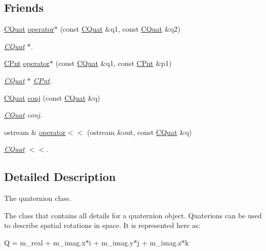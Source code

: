 \subsection*{Friends}
\begin{DoxyCompactItemize}
\item 
\hyperlink{classCQuat}{C\-Quat} \hyperlink{classCQuat_a56293e53132060601a281240804d9302}{operator$\ast$} (const \hyperlink{classCQuat}{C\-Quat} \&q1, const \hyperlink{classCQuat}{C\-Quat} \&q2)
\begin{DoxyCompactList}\small\item\em \hyperlink{classCQuat}{C\-Quat} $\ast$. \end{DoxyCompactList}\item 
\hyperlink{classCPnt}{C\-Pnt} \hyperlink{classCQuat_ac98154ed89178004c9023423651b58a9}{operator$\ast$} (const \hyperlink{classCQuat}{C\-Quat} \&q1, const \hyperlink{classCPnt}{C\-Pnt} \&p1)
\begin{DoxyCompactList}\small\item\em \hyperlink{classCQuat}{C\-Quat} $\ast$ \hyperlink{classCPnt}{C\-Pnt}. \end{DoxyCompactList}\item 
\hyperlink{classCQuat}{C\-Quat} \hyperlink{classCQuat_a751f3ac0c157ff6967eaf2673ce1527e}{conj} (const \hyperlink{classCQuat}{C\-Quat} \&q)
\begin{DoxyCompactList}\small\item\em \hyperlink{classCQuat}{C\-Quat} conj. \end{DoxyCompactList}\item 
ostream \& \hyperlink{classCQuat_afeef42a3ba6ea600e39ee2accca10836}{operator$<$$<$} (ostream \&out, const \hyperlink{classCQuat}{C\-Quat} \&q)
\begin{DoxyCompactList}\small\item\em \hyperlink{classCQuat}{C\-Quat} $<$$<$. \end{DoxyCompactList}\end{DoxyCompactItemize}


\subsection{Detailed Description}
The quaternion class. 

The class that contains all details for a quaternion object. Quaterions can be used to describe spatial rotations in space. It is represented here as\-:

Q = m\-\_\-real + m\-\_\-imag.\-x$\ast$i + m\-\_\-imag.\-y$\ast$j + m\-\_\-imag.\-z$\ast$k

